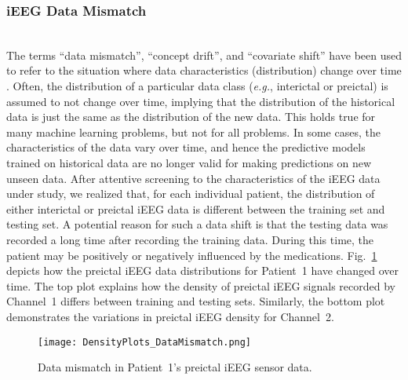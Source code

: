 \documentclass[journal]{IEEEtran}
\begin{document}
\subsubsection{iEEG Data Mismatch}~\\
The terms ``data mismatch'', ``concept drift'', and ``covariate shift'' have been used to refer to the situation where data characteristics (distribution) change over time \cite{vzliobaite2016overview}. Often, the distribution of a particular data class (\textit{e.g.}, interictal or preictal) is assumed to not change over time, implying that the distribution of the historical data is just the same as the distribution of the new data. This holds true for many machine learning problems, but not for all problems. In some cases, the characteristics of the data vary over time, and hence the predictive models trained on historical data are no longer valid for making predictions on new unseen data. After attentive screening to the characteristics of the iEEG data under study, we realized that, for each individual patient, the distribution of either interictal or preictal iEEG data is different between the training set and testing set. A potential reason for such a data shift is that the testing data was recorded a long time after recording the training data. During this time, the patient may be positively or negatively influenced by the medications. Fig.~\ref{Fig_DataMismatch} depicts how the preictal iEEG data distributions for Patient~1 have changed over time. The top plot explains how the density of preictal iEEG signals recorded by Channel~1 differs between training and testing sets. Similarly, the bottom plot demonstrates the variations in preictal iEEG density for Channel~2.          



\begin{figure}[!t]\centering
	\texttt{[image: DensityPlots\_DataMismatch.png]}
	\caption{Data mismatch in Patient~1's preictal iEEG sensor data.}
	\label{Fig_DataMismatch}
\end{figure}
\end{document}
